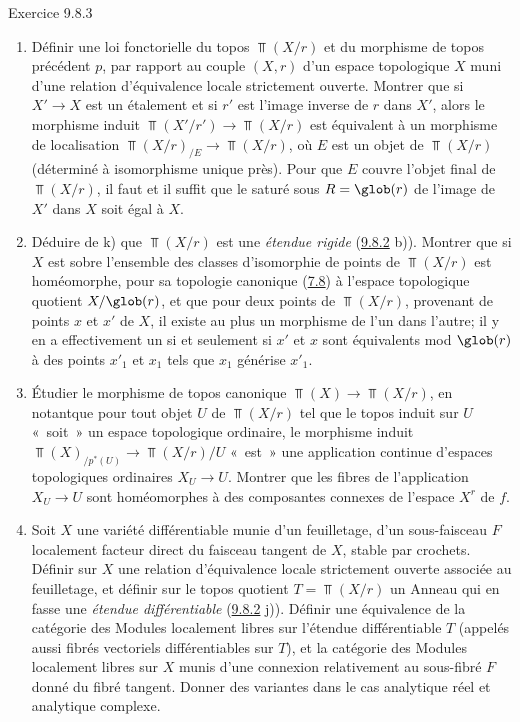 \documentclass[10pt]{../fichiers-configuration-latex/smfart}
\begin{document}
\begin{enonce*}[remark]{Exercice 9.8.3}
\begin{enumerate}
\item Définir une loi fonctorielle du topos $\Top(X/r)$ et du
morphisme de topos précédent $p$, par rapport au couple $(X,r)$ d'un
espace topologique $X$ muni d'une relation d'équivalence locale
strictement ouverte. Montrer que si $X'\rightarrow X$ est un
étalement et si $r'$ est l'image inverse de $r$ dans $X'$, alors le
morphisme induit $\Top(X'/r')\rightarrow \Top(X/r)$ est équivalent à
un morphisme de localisation $\Top(X/r)_{/E}\rightarrow \Top(X/r)$,
où $E$ est un objet de $\Top(X/r)$ (déterminé à isomorphisme unique
près). Pour que $E$ couvre l'objet final de $\Top(X/r)$, il faut et
il suffit que le saturé sous $R=\glob(r)$ de l'image de $X'$ dans
$X$ soit égal à $X$.

\item Déduire de k) que $\Top(X/r)$ est une \emph{étendue rigide}
(\hyperref[IV.exer9.8.2]{9.8.2} b)). Montrer que si $X$ est sobre l'ensemble des
classes
     d'isomorphie de points de $\Top(X/r)$ est homéomorphe, pour sa
     topologie canonique (\hyperref[IV.exer7.8]{7.8}) à l'espace topologique quotient
     $X/\glob(r)$, et que pour deux points de $\Top(X/r)$, provenant
     de points $x$ et $x'$ de $X$, il existe au plus un morphisme de
     l'un dans l'autre; il y en a effectivement un si et seulement si
     $x'$ et $x$ sont équivalents mod $\glob(r)$ à des points $x'_1$
     et $x_1$ tels que $x_1$ générise $x'_1$.

\item Étudier le morphisme de topos canonique $\Top(X)\rightarrow
     \Top(X/r)$, en notant\pageoriginale que pour tout objet $U$ de
     $\Top(X/r)$ tel que le topos induit sur $U$ « soit »  un
     espace topologique ordinaire, le morphisme induit
     $\Top(X)_{/p^{\ast}(U)}\rightarrow \Top(X/r)/U$ « est »  une
     application continue d'espaces topologiques ordinaires
     $X_U\rightarrow U$. Montrer que les fibres de l'application
     $X_U\rightarrow U$ sont homéomorphes à des composantes connexes
     de l'espace $X^r$ de $f$.

\item Soit $X$ une variété différentiable munie d'un feuilletage, \ie
     d'un sous-faisceau $F$ localement facteur direct du faisceau
     tangent de $X$, stable par crochets. Définir sur $X$ une relation
     d'équivalence locale strictement ouverte associée au feuilletage,
     et définir sur le topos quotient $T=\Top(X/r)$ un Anneau qui en
     fasse une \emph{étendue différentiable} (\hyperref[IV.exer9.8.2]{9.8.2} j)). Définir une
     équivalence de la catégorie des Modules localement libres sur
     l'étendue différentiable $T$ (appelés aussi fibrés vectoriels
     différentiables sur $T$), et la catégorie des Modules localement
     libres sur $X$ munis d'une connexion relativement au sous-fibré
     $F$ donné du fibré tangent. Donner des variantes dans le cas
     analytique réel et analytique complexe.
\end{enumerate}
\end{enonce*}
\end{document}
